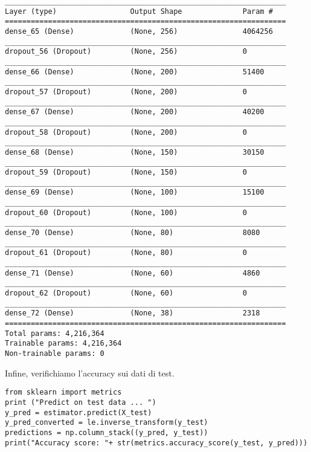 \begin{verbatim}
_________________________________________________________________
Layer (type)                 Output Shape              Param #   
=================================================================
dense_65 (Dense)             (None, 256)               4064256   
_________________________________________________________________
dropout_56 (Dropout)         (None, 256)               0         
_________________________________________________________________
dense_66 (Dense)             (None, 200)               51400     
_________________________________________________________________
dropout_57 (Dropout)         (None, 200)               0         
_________________________________________________________________
dense_67 (Dense)             (None, 200)               40200     
_________________________________________________________________
dropout_58 (Dropout)         (None, 200)               0         
_________________________________________________________________
dense_68 (Dense)             (None, 150)               30150     
_________________________________________________________________
dropout_59 (Dropout)         (None, 150)               0         
_________________________________________________________________
dense_69 (Dense)             (None, 100)               15100     
_________________________________________________________________
dropout_60 (Dropout)         (None, 100)               0         
_________________________________________________________________
dense_70 (Dense)             (None, 80)                8080      
_________________________________________________________________
dropout_61 (Dropout)         (None, 80)                0         
_________________________________________________________________
dense_71 (Dense)             (None, 60)                4860      
_________________________________________________________________
dropout_62 (Dropout)         (None, 60)                0         
_________________________________________________________________
dense_72 (Dense)             (None, 38)                2318      
=================================================================
Total params: 4,216,364
Trainable params: 4,216,364
Non-trainable params: 0
\end{verbatim}
Infine, verifichiamo l'accuracy sui dati di test.
\begin{verbatim}
from sklearn import metrics
print ("Predict on test data ... ")
y_pred = estimator.predict(X_test)
y_pred_converted = le.inverse_transform(y_test)
predictions = np.column_stack((y_pred, y_test))
print("Accuracy score: "+ str(metrics.accuracy_score(y_test, y_pred)))
\end{verbatim}
